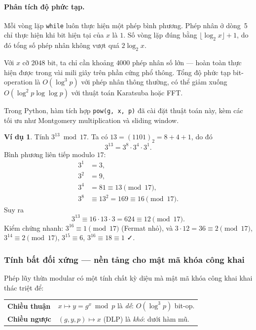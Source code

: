 \documentclass[12pt,a4paper]{report}
\theoremstyle{definition}
\newtheorem{example}[theorem]{Ví dụ}
\theoremstyle{remark}
\begin{document}
\paragraph{Phân tích độ phức tạp.}
Mỗi vòng lặp \texttt{while} luôn thực hiện một phép bình phương. Phép nhân ở dòng~5 chỉ thực hiện khi bit hiện tại của $x$ là $1$. Số vòng lặp đúng bằng $\lfloor \log_2 x \rfloor + 1$, do đó tổng số phép nhân không vượt quá $2 \log_2 x$.

Với $x$ cỡ $2048$ bit, ta chỉ cần khoảng $4000$ phép nhân số lớn --- hoàn toàn thực hiện được trong vài mili giây trên phần cứng phổ thông. Tổng độ phức tạp bit-operation là $O(\log^3 p)$ với phép nhân thông thường, có thể giảm xuống $O(\log^2 p \log\log p)$ với thuật toán Karatsuba hoặc FFT.

Trong Python, hàm tích hợp \texttt{pow(g, x, p)} đã cài đặt thuật toán này, kèm các tối ưu như Montgomery multiplication và sliding window.

\begin{example}
\label{ex:modexp}
Tính $3^{13} \bmod 17$. Ta có $13 = (1101)_2 = 8 + 4 + 1$, do đó
\[
3^{13} = 3^{8} \cdot 3^{4} \cdot 3^{1}.
\]
Bình phương liên tiếp modulo $17$:
\begin{align*}
3^1 &= 3, \\
3^2 &= 9, \\
3^4 &= 81 \equiv 13 \pmod{17}, \\
3^8 &\equiv 13^2 = 169 \equiv 16 \pmod{17}.
\end{align*}
Suy ra
\[
3^{13} \equiv 16 \cdot 13 \cdot 3 = 624 \equiv 12 \pmod{17}.
\]
Kiểm chứng nhanh: $3^{16} \equiv 1 \pmod{17}$ (Fermat nhỏ), và $3 \cdot 12 = 36 \equiv 2 \pmod{17}$, $3^{14} \equiv 2 \pmod{17}$, $3^{15} \equiv 6$, $3^{16} \equiv 18 \equiv 1$ ✓.
\end{example}

\subsubsection{Tính bất đối xứng --- nền tảng cho mật mã khóa công khai}

Phép lũy thừa modular có một tính chất kỳ diệu mà mật mã khóa công khai khai thác triệt để:

\begin{center}
\renewcommand{\arraystretch}{1.3}
\begin{tabular}{ll}
\toprule
\textbf{Chiều thuận} & $x \longmapsto y = g^x \bmod p$ là \emph{dễ}: $O(\log^3 p)$ bit-op. \\
\textbf{Chiều ngược} & $(g, y, p) \longmapsto x$ (DLP) là \emph{khó}: dưới hàm mũ. \\
\bottomrule
\end{tabular}
\end{center}
\end{document}
